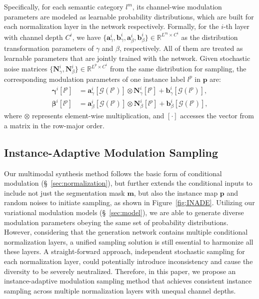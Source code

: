 \documentclass[final]{cvpr}
\begin{document}
Specifically, for each semantic category $l^m$, its channel-wise modulation parameters are modeled as learnable probability distributions, which are built for each normalization layer in the network respectively. Formally, for the $i$-th layer with channel depth $C^i$, we have $\{\bm{a}^i_{\gamma},\bm{b}^i_{\gamma},\bm{a}^i_{\beta},\bm{b}^i_{\beta}\}\in\mathbb{R}^{L^m\times C^i}$ as the distribution transformation parameters of $\gamma$ and $\beta$, respectively. All of them are treated as learnable parameters that are jointly trained with the network. Given stochastic noise matrices $\{\bm{N}^i_\gamma,\bm{N}^i_\beta\}\in\mathbb{R}^{L^p\times C^i}$ from the same distribution for sampling, the corresponding modulation parameters of one instance label $l^p$ in $\bm{p}$ are:
\begin{equation}
\begin{split}
  \bm{\gamma}^i[l^p]&=\bm{a}^i_\gamma[\mathcal{G}(l^p)]\otimes\bm{N}^i_\gamma[l^p]+\bm{b}^i_\gamma[\mathcal{G}(l^p)],\\
  \bm{\beta}^i[l^p]&=\bm{a}^i_\beta[\mathcal{G}(l^p)]\otimes\bm{N}^i_\beta[l^p]+\bm{b}^i_\beta[\mathcal{G}(l^p)],
\end{split}
\label{eq:sample}
\end{equation}
where $\otimes$ represents element-wise multiplication, and $[\cdot]$ accesses the vector from a matrix in the row-major order. 

\subsection{Instance-Adaptive Modulation Sampling}
\label{sec:sampling}
Our multimodal synthesis method follows the basic form of conditional modulation (\S~\ref{sec:normalization}), but further extends the conditional inputs to include not just the segmentation mask $\bm{m}$, but also the instance map $\bm{p}$ and random noises to initiate sampling, as shown in Figure~\ref{fig:INADE}. Utilizing our variational modulation models (\S~\ref{sec:model}), we are able to generate diverse modulation parameters obeying the same set of probability distributions. However, considering that the generation network contains multiple conditional normalization layers, a unified sampling solution is still essential to harmonize all these layers. A straight-forward approach, independent stochastic sampling for each normalization layer, could potentially introduce inconsistency and cause the diversity to be severely neutralized. Therefore, in this paper, we propose an instance-adaptive modulation sampling method that achieves consistent instance sampling across multiple normalization layers with unequal channel depths.
\end{document}
